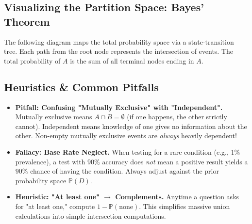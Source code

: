 \documentclass[12pt, a4paper]{article}
\theoremstyle{definition}
\theoremstyle{remark}
\newcommand{\Prob}{\mathbb{P}}
\newcommand{\W}{\Omega}
\newcommand{\1}{\mathbf{1}}
\begin{document}
\subsection{Visualizing the Partition Space: Bayes' Theorem}
The following diagram maps the total probability space via a state-transition tree. Each path from the root node represents the intersection of events. The total probability of $A$ is the sum of all terminal nodes ending in $A$.

\vspace{0.5cm}
\begin{center}
\end{center}
\vspace{0.5cm}

\subsection{Heuristics \& Common Pitfalls}
\begin{itemize}
    \item \textbf{Pitfall: Confusing "Mutually Exclusive" with "Independent".} Mutually exclusive means $A \cap B = \emptyset$ (if one happens, the other strictly cannot). Independent means knowledge of one gives no information about the other. Non-empty mutually exclusive events are \textit{always} heavily dependent!
    \item \textbf{Fallacy: Base Rate Neglect.} When testing for a rare condition (e.g., $1\%$ prevalence), a test with $90\%$ accuracy does \textit{not} mean a positive result yields a $90\%$ chance of having the condition. Always adjust against the prior probability space $\Prob(D)$.
    \item \textbf{Heuristic: "At least one" $\to$ Complements.} Anytime a question asks for "at least one," compute $1 - \Prob(\text{none})$. This simplifies massive union calculations into simple intersection computations.
\end{itemize}
\end{document}
